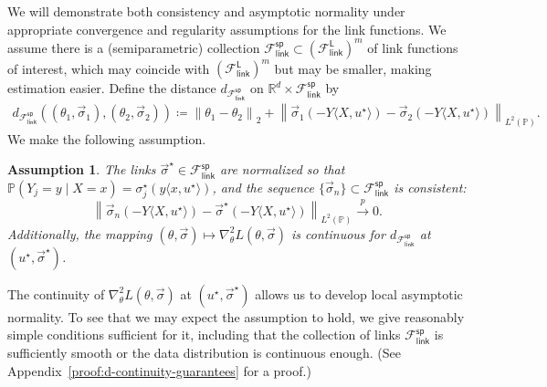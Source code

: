 \documentclass[11pt]{article}
\newcommand{\Prb}{\mathbb{P}}
\newcommand{\R}{\mathbb{R}} %
\renewcommand{\P}{\mathbb{P}}
\newcommand{\norm}[1]{\left\|{#1}\right\|} %
\newcommand{\poploss}{L}
\newcommand{\fsymlinkL}{\mathcal{F}_{\mathsf{link}}^{\mathsf{L}}}
\newcommand{\fsymlinksp}{\mathcal{F}_{\mathsf{link}}^{\mathsf{sp}}}
\newcommand{\ltwo}[1]{\norm{#1}_2} %
\newcommand{\<}{\langle} %
\renewcommand{\>}{\rangle}
\newcommand{\cp}{\stackrel{p}{\rightarrow}}
\newcommand{\defeq}{\coloneqq}
\newcommand{\LtwoPbold}[1]{\norm{#1}_{L^2(\Prb)}}
\newcommand{\opt}{^\star}
\newtheorem{assumption}{Assumption}
\begin{document}
We will demonstrate both consistency and
asymptotic normality under appropriate convergence and regularity
assumptions for the link functions. We assume there is a (semiparametric)
collection $\fsymlinksp \subset (\fsymlinkL)^m$ of link functions of
interest, which may coincide with $(\fsymlinkL)^m$ but may be smaller,
making estimation easier.  Define the distance $d_{\fsymlinksp}$ on $\R^d
\times \fsymlinksp$ by
\begin{align*}
  d_{\fsymlinksp}\left((\theta_1, \vec{\sigma}_1), (\theta_2, \vec{\sigma}_2)
  \right)
  \defeq
  \ltwo{\theta_1 - \theta_2}
  + \LtwoPbold{\vec{\sigma}_1(-Y\<X, u\opt\>)
    - \vec{\sigma}_2(-Y\<X, u\opt\>)}.
\end{align*}
We make the following assumption.
\begin{assumption}
  \label{assumption:sp-general}
  The links $\vec{\sigma}\opt \in \fsymlinksp$ are normalized so
  that $\P(Y_j = y \mid X = x) = \sigma\opt_j(y \<x, u\opt\>)$, and
  the sequence $\{\vec{\sigma}_n\} \subset \fsymlinksp$ is consistent:
  \begin{equation*}
    \LtwoPbold{\vec{\sigma}_n(-Y\<X, u\opt\>)
      - \vec{\sigma}\opt(-Y\<X, u\opt\>)}
    \cp 0.
  \end{equation*}
  Additionally, the mapping $(\theta, \vec{\sigma}) \mapsto
  \nabla_\theta^2 \poploss(\theta,
  \vec{\sigma})$ is continuous for $d_{\fsymlinksp}$ at $(u\opt,
  \vec{\sigma}\opt)$.
\end{assumption}
The continuity of $\nabla_\theta^2 \poploss(\theta, \vec{\sigma})$ at
$(u\opt, \vec{\sigma}\opt)$ allows us to develop local asymptotic normality.
To see that we may expect the assumption to hold, we give reasonably simple
conditions sufficient for it, including that the collection of links
$\fsymlinksp$ is sufficiently smooth or the data distribution is continuous
enough. (See Appendix~\ref{proof:d-continuity-guarantees} for a proof.)
\end{document}
